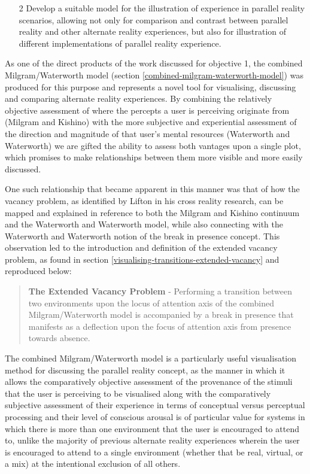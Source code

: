 \begin{enumerate}
	\item[2] Develop a suitable model for the illustration of experience in parallel reality scenarios, allowing not only for comparison and contrast between parallel reality and other alternate reality experiences, but also for illustration of different implementations of parallel reality experience.
\end{enumerate}

As one of the direct products of the work discussed for objective 1, the combined Milgram/Waterworth model (section \ref{combined-milgram-waterworth-model}) was produced for this purpose and represents a novel tool for visualising, discussing and comparing alternate reality experiences. By combining the relatively objective assessment of where the percepts a user is perceiving originate from (Milgram and Kishino) with the more subjective and experiential assessment of the direction and magnitude of that user's mental resources (Waterworth and Waterworth) we are gifted the ability to assess both vantages upon a single plot, which promises to make relationships between them more visible and more easily discussed.

One such relationship that became apparent in this manner was that of how the vacancy problem, as identified by Lifton in his cross reality research, can be mapped and explained in reference to both the Milgram and Kishino continuum and the Waterworth and Waterworth model, while also connecting with the Waterworth and Waterworth notion of the break in presence concept. This observation led to the introduction and definition of the extended vacancy problem, as found in section \ref{visualising-transitions-extended-vacancy} and reproduced below:

\begin{quote}
	\textbf{The Extended Vacancy Problem} - Performing a transition between two environments upon the locus of attention axis of the combined Milgram/Waterworth model is accompanied by a break in presence that manifests as a deflection upon the focus of attention axis from presence towards absence.
\end{quote}

The combined Milgram/Waterworth model is a particularly useful visualisation method for discussing the parallel reality concept, as the manner in which it allows the comparatively objective assessment of the provenance of the stimuli that the user is perceiving to be visualised along with the comparatively subjective assessment of their experience in terms of conceptual versus perceptual processing and their level of conscious arousal is of particular value for systems in which there is more than one environment that the user is encouraged to attend to, unlike the majority of previous alternate reality experiences wherein the user is encouraged to attend to a single environment (whether that be real, virtual, or a mix) at the intentional exclusion of all others.

